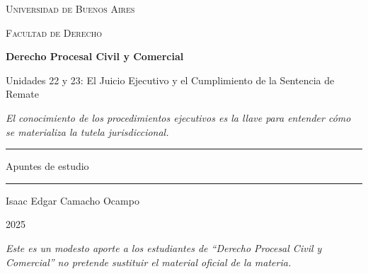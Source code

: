 \documentclass[12pt,oneside]{book}
\newcommand{\universidad}{Universidad de Buenos Aires}
\newcommand{\facultad}{Facultad de Derecho}
\newcommand{\materia}{Derecho Procesal Civil y Comercial}
\newcommand{\titulo}{Unidades 22 y 23: El Juicio Ejecutivo y el Cumplimiento de la Sentencia de Remate}
\newcommand{\autor}{Isaac Edgar Camacho Ocampo}
\newcommand{\anio}{2025}
\begin{document}

\begin{titlepage}

\thispagestyle{empty}

\begin{center}

\vspace*{1cm}

{\large \textsc{\universidad}}

\vspace{0.2cm}

{\large \textsc{\facultad}}

\vspace{3cm}

{\Huge \textbf{\materia}}

\vspace{1cm}

{\LARGE \titulo}

\vspace{0.8cm}

\textit{El conocimiento de los procedimientos ejecutivos es la llave para entender cómo se materializa la tutela jurisdiccional.}

\vspace{1.2cm}

\rule{0.70\textwidth}{0.5pt}

\vspace{0.5cm}

{\large Apuntes de estudio}

\vspace{0.5cm}

\rule{0.70\textwidth}{0.5pt}

\vfill

{\large \autor}

\vspace{0.3cm}

{\large \anio}

\end{center}

\vfill

\begin{flushleft}
\textit{Este es un modesto aporte a los estudiantes de ``Derecho Procesal Civil y Comercial'' no pretende sustituir el material oficial de la materia.}
\end{flushleft}

\end{titlepage}
\end{document}
